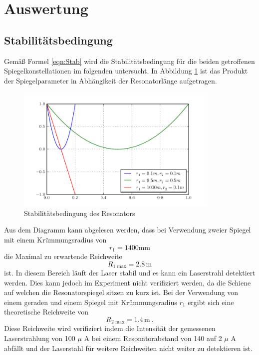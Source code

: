 \section{Auswertung}
\label{sec:Auswertung}

\subsection{Stabilitätsbedingung}
Gemäß Formel \ref{eqn:Stab} wird die Stabilitätsbedingung für die beiden getroffenen Spiegelkonstellationen im folgenden untersucht. In Abbildung \ref{fig:stabi} ist das Produkt der Spiegelparameter in Abhängikeit der Resonatorlänge aufgetragen. 
\begin{figure}
  \centering
  \includegraphics[height=6cm]{Stabilisationsparameter.pdf} 
  \caption{Stabilitätsbedingung des Resonators}
  \label{fig:stabi}
\end{figure}
Aus dem Diagramm kann abgelesen werden, dass bei Verwendung zweier Spiegel mit einem Krümmungsradius von 
\begin{equation}
  r_1 = 1400 \text{mm}
  \label{eqn:rad1}
\end{equation}
die Maximal zu erwartende Reichweite
\begin{equation}
  R_\text{1 max} = 2.8 \, \text{m}
  \label{eqn:rmax1}
\end{equation}
ist. In diesem Bereich läuft der Laser stabil und es kann ein Laserstrahl detektiert werden. Dies kann jedoch im Experiment nicht verifiziert werden, da die Schiene auf welchen die Resonatorspiegel sitzen zu kurz ist. Bei der Verwendung von einem geraden und einem Spiegel mit Krümmungsradius $r_1$ ergibt sich eine theoretische Reichweite von
\begin{equation}
  R_\text{2 max} = 1.4 \, \text{m} \ .
  \label{eqn:rmax2}
\end{equation}
Diese Reichweite wird verifiziert indem die Intensität der gemessenen Laserstrahlung von 100 $\mu$ A bei einem Resonatorabstand von 140 auf 2 $\mu$ A abfällt und der Laserstahl für weitere Reichweiten nicht weiter zu detektieren ist.

